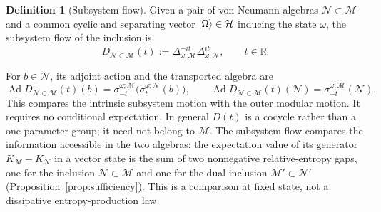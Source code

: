 \documentclass[a4paper,11pt]{article}
\theoremstyle{definition}
\newtheorem{definition}{Definition}[section]
\newcommand{\mN}{\mathcal{N}}
\newcommand{\mM}{\mathcal{M}}
\begin{document}
\begin{definition}[Subsystem flow]\label{def:subsystem-flow}
    Given a pair of von Neumann algebras $\mN\subset\mM$ and a common cyclic and separating vector $\ket{\Omega}\in\mathcal{H}$ inducing the state $\omega$, the subsystem flow of the inclusion is
    \begin{equation}
        D_{\mN\subset\mM}(t):=\Delta_{\omega;\mM}^{-it}\Delta_{\omega;\mN}^{it},\qquad t\in\mathbb R.
    \end{equation}
\end{definition}
For $b\in\mN$, its adjoint action and the transported algebra are
\begin{equation}\label{eq:characteristic-algebra-transport}
 \operatorname{Ad}D_{\mN\subset\mM}(t)(b)=\sigma^{\omega;\mM}_{-t}\bigl(\sigma^{\omega;\mN}_t(b)\bigr),
 \qquad \operatorname{Ad}D_{\mN\subset\mM}(t)(\mN)=\sigma^{\omega;\mM}_{-t}(\mN).
\end{equation}
This compares the intrinsic subsystem motion with the outer modular motion.
It requires no conditional expectation. In general $D(t)$ is a cocycle rather than
a one-parameter group; it need not belong to $\mM$.
The subsystem flow compares the information accessible in the two algebras: the expectation value of its generator $K_{\mM}-K_{\mN}$ in a vector state is the sum of two nonnegative relative-entropy gaps, one for the inclusion $\mN\subset\mM$ and one for the dual inclusion $\mM'\subset\mN'$ (Proposition~\ref{prop:sufficiency}). This is a comparison at fixed state, not a dissipative entropy-production law.
\end{document}
